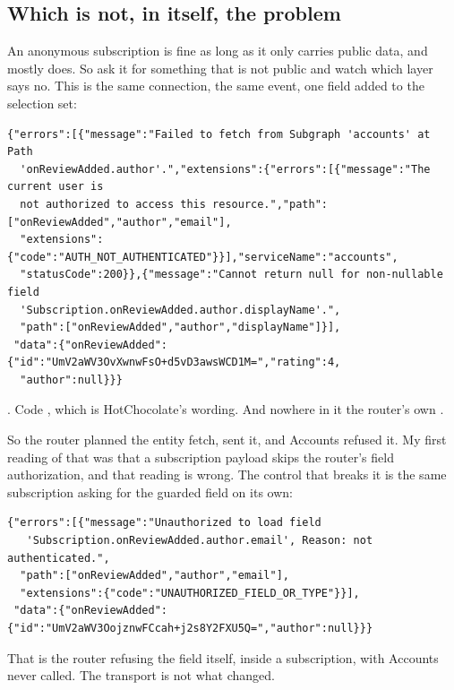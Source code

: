 \subsection*{Which is not, in itself, the problem}

%
An anonymous subscription is fine as long as it only carries public data, and
 mostly does. So ask it for something that is not public and
watch which layer says no. This is the same connection, the same event, one
field added to the selection set:

\begin{verbatim}
{"errors":[{"message":"Failed to fetch from Subgraph 'accounts' at Path
  'onReviewAdded.author'.","extensions":{"errors":[{"message":"The current user is
  not authorized to access this resource.","path":["onReviewAdded","author","email"],
  "extensions":{"code":"AUTH_NOT_AUTHENTICATED"}}],"serviceName":"accounts",
  "statusCode":200}},{"message":"Cannot return null for non-nullable field
  'Subscription.onReviewAdded.author.displayName'.",
  "path":["onReviewAdded","author","displayName"]}],
 "data":{"onReviewAdded":{"id":"UmV2aWV3OvXwnwFsO+d5vD3awsWCD1M=","rating":4,
  "author":null}}}
\end{verbatim}

. Code , which is
HotChocolate's wording. And nowhere in it the router's own
.

So the router planned the entity fetch, sent it, and Accounts refused it. My
first reading of that was that a subscription payload skips the router's field
authorization, and that reading is wrong. The control that breaks it is the same
subscription asking for the guarded field on its own:

\begin{verbatim}
{"errors":[{"message":"Unauthorized to load field
   'Subscription.onReviewAdded.author.email', Reason: not authenticated.",
  "path":["onReviewAdded","author","email"],
  "extensions":{"code":"UNAUTHORIZED_FIELD_OR_TYPE"}}],
 "data":{"onReviewAdded":{"id":"UmV2aWV3OojznwFCcah+j2s8Y2FXU5Q=","author":null}}}
\end{verbatim}

That is the router refusing the field itself, inside a subscription, with
Accounts never called. The transport is not what changed.


